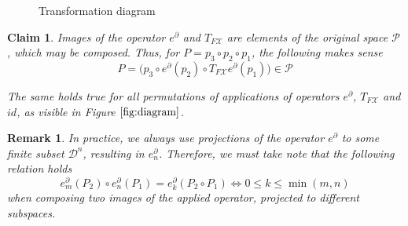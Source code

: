 \documentclass[smallcondensed]{svjour3}
\newcommand{\X}{\mathcal{X}}
\newcommand{\dP}{\mathcal{P}}
\newcommand{\D}{\partial}
\newcommand{\DD}{\mathcal{D}}
\newtheorem{trditev}{Claim}[section]
\newtheorem{opomba}{Remark}[section]
\begin{document}
\begin{wrapfigure}{}{0.5\textwidth}
\caption{Transformation diagram} \label{fig:diagram} 
\vspace{-1cm}
\end{wrapfigure}




\begin{trditev}\label{trd:composeOperators}
Images of the operator $e^\D$ and $T_{F\X}$  are elements of the original space $\dP$, which may be composed. Thus, for $P=p_3\circ p_2\circ p_1$, the following makes sense
\begin{equation}
P=\Big(p_3\circ e^ \D(p_2)\circ T_{F\X}e^\D(p_1)\Big) \in \dP
\end{equation}

The same holds true for all permutations of applications of operators $e^\D$, $T_{F\X}$ and $id$, as visible in Figure $\ref{fig:diagram}$.
\end{trditev}

\begin{opomba}
In practice, we always use projections of the operator $e^\D$ to some finite subset $\DD^n$, resulting in $e^\D_n$. Therefore, we must take note that the following relation holds
\begin{equation}
e^\D_m(P_2)\circ e^\D_n(P_1)=e^\D_k(P_2\circ P_1)\iff 0\le k\le \min(m,n)
\end{equation}
when composing two images of the applied operator, projected to different subspaces.
\end{opomba}
\end{document}

